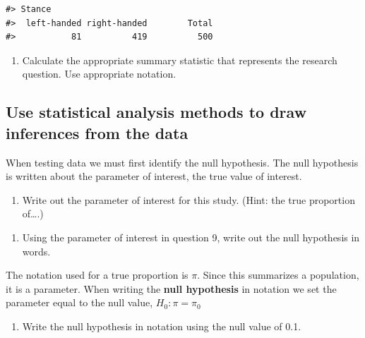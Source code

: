 \documentclass[
]{report}
\providecommand{\tightlist}{%
  \setlength{\itemsep}{0pt}\setlength{\parskip}{0pt}}
\begin{document}
\begin{verbatim}
#> Stance
#>  left-handed right-handed        Total 
#>           81          419          500
\end{verbatim}

\begin{enumerate}
\def\labelenumi{\arabic{enumi}.}
\setcounter{enumi}{7}
\tightlist
\item
  Calculate the appropriate summary statistic that represents the research question. Use appropriate notation.
\end{enumerate}

\vspace{0.5in}

\hypertarget{use-statistical-analysis-methods-to-draw-inferences-from-the-data}{%
\subsection{Use statistical analysis methods to draw inferences from the data}\label{use-statistical-analysis-methods-to-draw-inferences-from-the-data}}

When testing data we must first identify the null hypothesis. The null hypothesis is written about the parameter of interest, the true value of interest.

\begin{enumerate}
\def\labelenumi{\arabic{enumi}.}
\setcounter{enumi}{8}
\tightlist
\item
  Write out the parameter of interest for this study. (Hint: the true proportion of\ldots.)
\end{enumerate}

\vspace{1in}

\begin{enumerate}
\def\labelenumi{\arabic{enumi}.}
\setcounter{enumi}{9}
\tightlist
\item
  Using the parameter of interest in question 9, write out the null hypothesis in words.
\end{enumerate}

\vspace{1in}

\newpage

The notation used for a true proportion is \(\pi\). Since this summarizes a population, it is a parameter. When writing the \textbf{null hypothesis} in notation we set the parameter equal to the null value, \(H_0: \pi = \pi_0\)

\begin{enumerate}
\def\labelenumi{\arabic{enumi}.}
\setcounter{enumi}{10}
\tightlist
\item
  Write the null hypothesis in notation using the null value of 0.1.
\end{enumerate}
\end{document}
